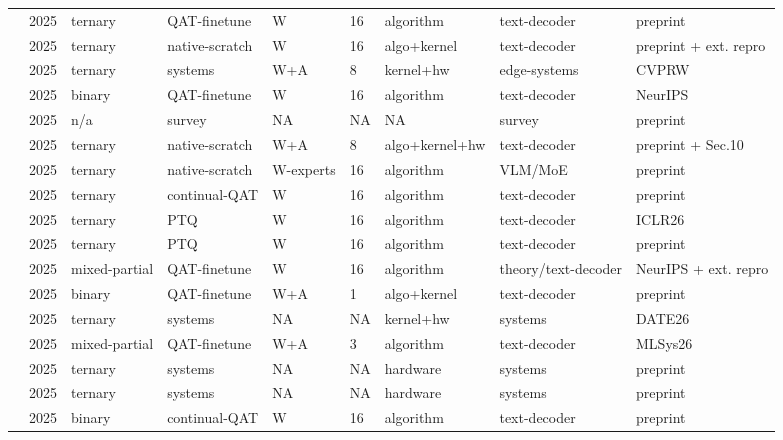 \documentclass[11pt]{article}
\begin{document}
\begin{landscape}
\begin{longtable}{p{3.2cm} p{1cm} p{1.9cm} p{2.2cm} p{2.2cm} p{1.3cm} p{2.2cm} p{2.1cm} p{2.5cm}}
\citet{Huang2025-Tequila} & 2025 & ternary & QAT-finetune & W & 16 & algorithm & text-decoder & preprint \\
\citet{Vaidhya2025-Spectra11} & 2025 & ternary & native-scratch & W & 16 & algo+\allowbreak{}kernel & text-decoder & preprint +\allowbreak{} ext. repro \\
\citet{Ardakani2025-LLMPi} & 2025 & ternary & systems & W+\allowbreak{}A & 8 & kernel+\allowbreak{}hw & edge-systems & CVPRW \\
\citet{Lee2025-LittleBit} & 2025 & binary & QAT-finetune & W & 16 & algorithm & text-decoder & Neur\allowbreak{}IPS \\
\citet{Liu2025-SurveyBNNLLM} & 2025 & n/\allowbreak{}a & survey & NA & NA & NA & survey & preprint \\
\citet{Ma2025-BitNet2B4T} & 2025 & ternary & native-scratch & W+\allowbreak{}A & 8 & algo+\allowbreak{}kernel+\allowbreak{}hw & text-decoder & preprint +\allowbreak{} Sec.10 \\
\citet{Wang2025-MoTE} & 2025 & ternary & native-scratch & W-experts & 16 & algorithm & VLM/\allowbreak{}Mo\allowbreak{}E & preprint \\
\citet{Nielsen2025-ContinualQAT} & 2025 & ternary & continual-QAT & W & 16 & algorithm & text-decoder & preprint \\
\citet{Yan2025-PT2LLM} & 2025 & ternary & PTQ & W & 16 & algorithm & text-decoder & ICLR26 \\
\citet{Xiao2025-PTQTP} & 2025 & ternary & PTQ & W & 16 & algorithm & text-decoder & preprint \\
\citet{Liu2025-ParetoQ} & 2025 & mixed-partial & QAT-finetune & W & 16 & algorithm & theory/\allowbreak{}text-decoder & Neur\allowbreak{}IPS +\allowbreak{} ext. repro \\
\citet{Panferov2025-QuEST} & 2025 & binary & QAT-finetune & W+\allowbreak{}A & 1 & algo+\allowbreak{}kernel & text-decoder & preprint \\
\citet{Oh2025-TSAR} & 2025 & ternary & systems & NA & NA & kernel+\allowbreak{}hw & systems & DATE26 \\
\citet{Tabesh2025-CAGE} & 2025 & mixed-partial & QAT-finetune & W+\allowbreak{}A & 3 & algorithm & text-decoder & MLSys26 \\
\citet{Xu2025-TeLLMe} & 2025 & ternary & systems & NA & NA & hardware & systems & preprint \\
\citet{Chen2025-TerEffic} & 2025 & ternary & systems & NA & NA & hardware & systems & preprint \\
\citet{Tu2025-Rethink1bitOpt} & 2025 & binary & continual-QAT & W & 16 & algorithm & text-decoder & preprint \\

\end{longtable}
\end{landscape}
\end{document}

